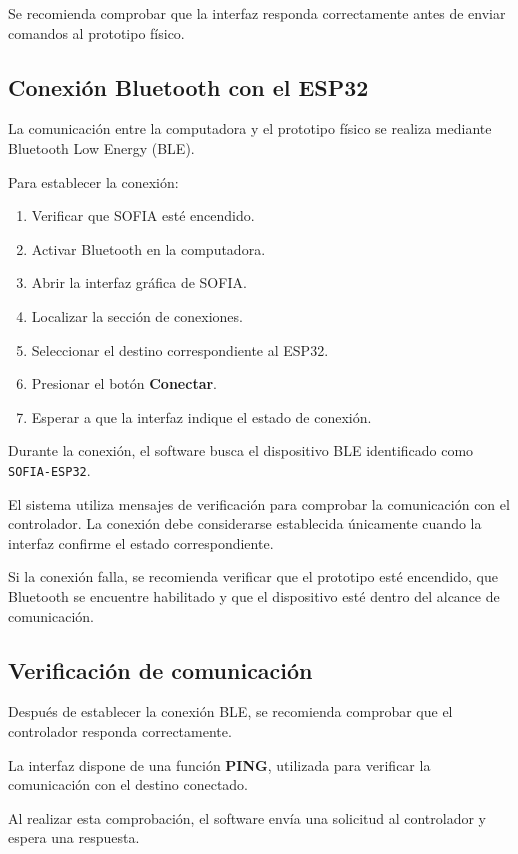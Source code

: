 \documentclass[letterpaper,journal]{IEEEtran}
\begin{document}
Se recomienda comprobar que la interfaz
responda correctamente antes de enviar
comandos al prototipo físico.

\subsection{Conexión Bluetooth con el ESP32}

La comunicación entre la computadora y el
prototipo físico se realiza mediante Bluetooth
Low Energy (BLE).

Para establecer la conexión:

\begin{enumerate}
    \item Verificar que SOFIA esté encendido.
    \item Activar Bluetooth en la computadora.
    \item Abrir la interfaz gráfica de SOFIA.
    \item Localizar la sección de conexiones.
    \item Seleccionar el destino correspondiente
    al ESP32.
    \item Presionar el botón \textbf{Conectar}.
    \item Esperar a que la interfaz indique
    el estado de conexión.
\end{enumerate}

Durante la conexión, el software busca
el dispositivo BLE identificado como
\texttt{SOFIA-ESP32}.

El sistema utiliza mensajes de verificación
para comprobar la comunicación con el
controlador. La conexión debe considerarse
establecida únicamente cuando la interfaz
confirme el estado correspondiente.

Si la conexión falla, se recomienda verificar
que el prototipo esté encendido, que Bluetooth
se encuentre habilitado y que el dispositivo
esté dentro del alcance de comunicación.

\subsection{Verificación de comunicación}

Después de establecer la conexión BLE,
se recomienda comprobar que el controlador
responda correctamente.

La interfaz dispone de una función
\textbf{PING}, utilizada para verificar
la comunicación con el destino conectado.

Al realizar esta comprobación, el software
envía una solicitud al controlador y espera
una respuesta.
\end{document}
